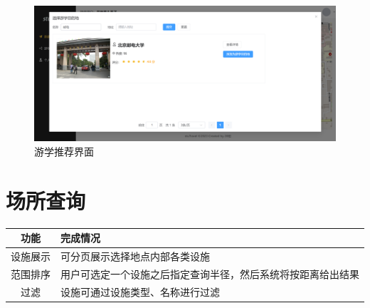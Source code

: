 \documentclass{report}
\begin{document}
\begin{figure}[!ht]
\begin{center}
        \includegraphics*[width=\textwidth]{figure/2.2-fl.png}
    \end{center}
    \caption{游学推荐界面}
\end{figure}


\section{场所查询}
\begin{table}[!ht]
    \centering
    \begin{tabularx}{\textwidth}{|c|X|}
        \hline
        \textbf{功能} & \textbf{完成情况} \\ \hline
        设施展示 & 可分页展示选择地点内部各类设施 \\ \hline
        范围排序 & 用户可选定一个设施之后指定查询半径，然后系统将按距离给出结果 \\ \hline
        过滤 & 设施可通过设施类型、名称进行过滤 \\ \hline
    \end{tabularx}
\end{table}
\end{document}
